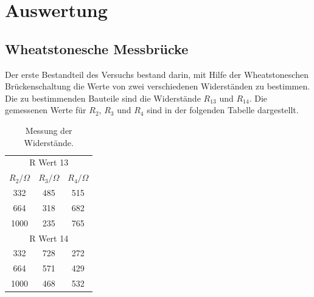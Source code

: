 \section{Auswertung}
\subsection{Wheatstonesche Messbrücke}
Der erste Bestandteil des Versuchs bestand darin, mit Hilfe der Wheatstoneschen Brückenschaltung die Werte von zwei verschiedenen Widerständen zu bestimmen.
Die zu bestimmenden Bauteile sind die Widerstände $R_\text{13}$ und $R_\text{14}$.
Die gemessenen Werte für $R_2$, $R_3$ und $R_4$ sind in der folgenden Tabelle dargestellt.

\begin{table}[h!]
    \begin{center}
      \caption{Messung der Widerstände.}
      \label{tab:Tabelle 1}
      \begin{tabular}{c|c|c} 
        \multicolumn{3}{c}{R Wert 13} \\
        \textbf{$R_2 / \Omega$ } & \textbf{$R_3 / \Omega$} & \textbf{$R_4 / \Omega$}\\
        \hline
        332 & 485 & 515\\
        664 & 318 & 682\\
        1000 & 235 & 765\\
        \multicolumn{3}{c}{R Wert 14} \\
        \hline
        332 & 728 & 272\\
        664 & 571 & 429\\
        1000 & 468 & 532\\
      \end{tabular}
    \end{center}
\end{table}

